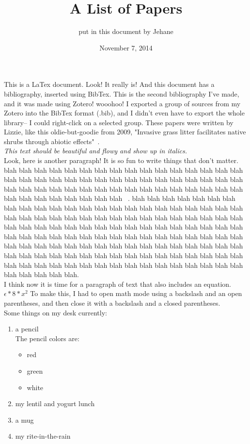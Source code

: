 \documentclass[11pt]{article}
\begin{document}
\title{A List of Papers}
\author{put in this document by Jehane}
\date{November 7, 2014}
\maketitle

This is a LaTex document. Look! It really is! And this document has a bibliography, inserted using BibTex. This is the second bibliography I've made, and it was made using Zotero! wooohoo! I exported a group of sources from my Zotero into the BibTex format (.bib), and I didn't even have to export the whole library-- I could right-click on a selected group. These papers were written by Lizzie, like this oldie-but-goodie from 2009, "Invasive grass litter facilitates native shrubs through abiotic effects"~\citep{wolkovich_invasive_2009}.\\

\emph{This text should be beautiful and flowy and show up in italics.}\\

Look, here is another paragraph! It is so fun to write things that don't matter. blah blah blah blah blah blah blah blah blah blah blah blah blah blah blah blah blah blah blah blah blah blah blah blah blah blah blah blah blah blah blah blah blah blah blah blah blah blah blah blah blah blah blah blah blah blah blah blah blah blah blah blah blah blah blah blah ~\citep{cook_divergent_2012}. blah blah blah blah blah blah blah blah blah blah blah blah blah blah blah blah blah blah blah blah blah blah blah blah blah blah blah blah blah blah blah blah blah blah blah blah blah blah blah blah blah blah blah blah blah blah blah blah blah blah blah blah blah blah blah blah blah blah blah blah blah blah blah blah blah blah blah blah blah blah blah blah blah blah blah blah blah blah blah blah blah blah blah blah blah blah blah blah blah blah blah blah blah blah blah blah blah blah blah blah blah blah blah blah blah blah blah blah blah blah blah blah blah blah blah blah blah blah blah blah blah blah blah blah. ~\citep{pau_predicting_2011}\\

I think now it is time for a paragraph of text that also includes an equation. \(\epsilon*8*x^2\) To make this, I had to open math mode using a backslash and an open parentheses, and then close it with a backslash and a closed parentheses.\\

Some things on my desk currently:
\begin{enumerate}
\item a pencil\\
The pencil colors are:
\begin{itemize}
\item red
\item green
\item white
\end{itemize}
\item my lentil and yogurt lunch
\item a mug
\item my rite-in-the-rain
\end{enumerate}\\






\nocite{cook_divergent_2012, wolkovich_grass_2010, wolkovich_invasive_2009, cleland_phenological_2012, pau_predicting_2011, wilson_scavenging:_2011, wolkovich_phenology_2012, wolkovich_warming_2012}
\end{document}
